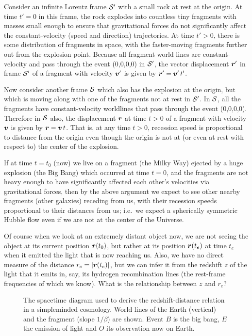 Consider an infinite Lorentz frame $\cal S'$ with a small rock at
rest at the origin.  At time $t'=0$ in this frame, the rock explodes
into countless tiny fragments with masses small enough to ensure that
gravitational forces do not significantly affect the constant-velocity
(speed and direction) trajectories.  At time $t'>0$, there is some
distribution of fragments in space, with the faster-moving fragments
further out from the explosion point.  Because all fragment world
lines are constant-velocity and pass through the event (0,0,0,0) in
$\cal S'$, the vector displacement $\mbox{\boldmath $r$}'$ in frame $\cal S'$ of
a fragment with velocity $\mbox{\boldmath $v$}'$ is given by $\mbox{\boldmath $r$}'=\mbox{\boldmath $v$}'\,
t'$.

Now consider another frame $\cal S$ which also has the explosion at
the origin, but which is moving along with one of the fragments not at
rest in $\cal S'$.  In $\cal S$, all the fragments have
constant-velocity worldlines that pass through the event (0,0,0,0).
Therefore in $\cal S$ also, the displacement $\mbox{\boldmath $r$}$ at time $t>0$
of a fragment with velocity $\mbox{\boldmath $v$}$ is given by $\mbox{\boldmath $r$} =\mbox{\boldmath $v$}\, t$.
That is, at any time $t>0$, recession speed is proportional to
distance from the origin even though the origin is not at (or even at
rest with respect to) the center of the explosion.

If at time $t=t_0$ (now) we live on a fragment (the Milky Way) ejected
by a huge explosion (the Big Bang) which occurred at time $t=0$, and
the fragments are not heavy enough to have significantly affected each
other's velocities via gravitational forces, then by the above
argument we expect to see other nearby fragments (other galaxies)
receding from us, with their recession speeds proportional to their
distances from us; i.e.\ we expect a spherically symmetric Hubble
flow even if we are not at the center of the Universe.

Of course when we look at an extremely distant object now, we are not
seeing the object at its current position $\mbox{\boldmath $r$} (t_0)$, but rather at
its position $\mbox{\boldmath $r$} (t_e)$ at time $t_e$ when it emitted the light that
is now reaching us.  Also, we have no direct measure of the distance
$r_e=|\mbox{\boldmath $r$} (t_e)|$, but we can infer it from the redshift $z$ of the
light that it emits in, say, its hydrogen recombination lines (the
rest-frame frequencies of which we know).  What is the relationship
between $z$ and $r_e$?

\begin{figure}
\caption[Cosmological spacetime diagram]{
The spacetime diagram used to derive the redshift-distance relation in
a simpleminded cosmology.  World lines of the Earth (vertical) and the
fragment (slope $1/\beta$) are shown.  Event $B$ is the big bang, $E$
the emission of light and $O$ its observation now on Earth.}
\label{fig:cosmology}
\end{figure}

